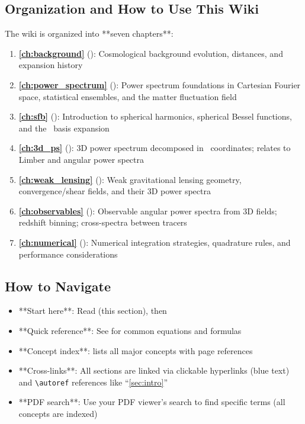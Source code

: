\subsection{Organization and How to Use This Wiki}\label{subsec:intro_organization}

The wiki is organized into **seven chapters**:

\begin{enumerate}
    \item \textbf{\cref{ch:background}} (): Cosmological background evolution, distances, and expansion history
    \item \textbf{\cref{ch:power_spectrum}} (): Power spectrum foundations in Cartesian Fourier space, statistical ensembles, and the matter fluctuation field
    \item \textbf{\cref{ch:sfb}} (): Introduction to spherical harmonics, spherical Bessel functions, and the \sfb\ basis expansion
    \item \textbf{\cref{ch:3d_ps}} (): 3D power spectrum decomposed in \sfb\ coordinates; relates to Limber and angular power spectra
    \item \textbf{\cref{ch:weak_lensing}} (): Weak gravitational lensing geometry, convergence/shear fields, and their 3D power spectra
    \item \textbf{\cref{ch:observables}} (): Observable angular power spectra from 3D fields; redshift binning; cross-spectra between tracers
    \item \textbf{\cref{ch:numerical}} (): Numerical integration strategies, quadrature rules, and performance considerations
\end{enumerate}

\subsection{How to Navigate}\label{subsec:intro_navigate}

\begin{itemize}
    \item **Start here**: Read  (this section), then 
    \item **Quick reference**: See  for common equations and formulas
    \item **Concept index**:  lists all major concepts with page references
    \item **Cross-links**: All sections are linked via clickable hyperlinks (blue text) and \texttt{\textbackslash autoref} references like ``\autoref{sec:intro}''
    \item **PDF search**: Use your PDF viewer's search to find specific terms (all concepts are indexed)
\end{itemize}

